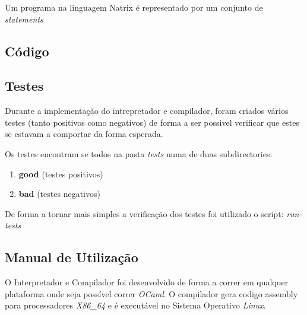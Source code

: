 Um programa na linguagem Natrix é representado por um conjunto de \textit{statements}


\clearpage

\subsection{Código}
\label{sec2:subsec:code}


\clearpage


\clearpage


\clearpage


\clearpage




\clearpage

\subsection{Testes}
\label{sec2:subsec:testes}

Durante a implementação do intrepretador e compilador, foram criados vários testes (tanto positivos como negativos) de forma a ser possivel verificar que estes se estavam a comportar da forma esperada.

Os testes encontram se todos na pasta \textit{tests} numa de duas subdirectories:

\begin{enumerate}
  \item \textbf{good} (testes positivos)
  \item \textbf{bad} (testes negativos)
\end{enumerate}

De forma a tornar mais simples a verificação dos testes foi utilizado o script: \textit{run-tests}

\subsection{Manual de Utilização}
\label{sec2:subsec:manual}

O Interpretador e Compilador foi desenvolvido de forma a correr em qualquer plataforma onde seja possível correr \textit{OCaml}. O compilador gera codigo assembly para processadores \textit{X86\_64} e é executável no Sistema Operativo \textit{Linux}.

